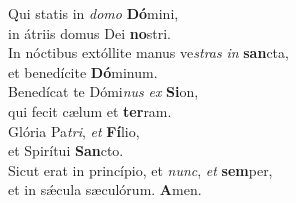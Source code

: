 \evenverse Qui statis in \textit{do}\textit{mo} \textbf{Dó}mini,~\*\\
\evenverse in átriis domus Dei \textbf{no}stri.\\
\oddverse In nóctibus extóllite manus ve\textit{stras} \textit{in} \textbf{san}cta,~\*\\
\oddverse et benedícite \textbf{Dó}minum.\\
\evenverse Benedícat te Dómi\textit{nus} \textit{ex} \textbf{Si}on,~\*\\
\evenverse qui fecit cælum et \textbf{ter}ram.\\
\oddverse Glória Pa\textit{tri}, \textit{et} \textbf{Fí}lio,~\*\\
\oddverse et Spirítui \textbf{San}cto.\\
\evenverse Sicut erat in princípio, et \textit{nunc}, \textit{et} \textbf{sem}per,~\*\\
\evenverse et in sǽcula sæculórum. \textbf{A}men.\\
